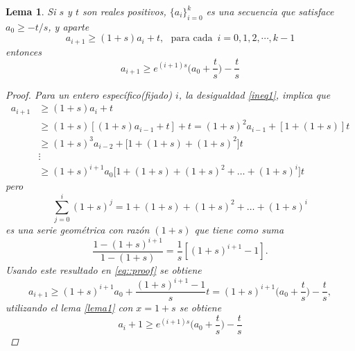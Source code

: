 \documentclass[a4paper]{article}
\newtheorem{lemma}{Lema}
\begin{document}
\begin{lemma}
Si $s$ y $t$ son reales positivos, $\{a_i\}_{i=0}^{k}$ es una secuencia que satisface $a_0\geq -t/s$, y aparte
\begin{equation}\label{ineq1}
a_{i+1}\geq (1+s)a_i + t, \,\,\,\, \text{para cada }\, i=0,1,2,\cdots, k-1
\end{equation}
entonces
\begin{equation*}
a_{i+1} \geq e^{(i+1)s}\bigg( a_0 +\frac{t}{s} \bigg)-\frac{t}{s}
\end{equation*}
\begin{proof}
Para un entero específico(fijado) $i$, la desigualdad  \ref{ineq1}, implica que 
\begin{equation}\label{eq::proof}
\begin{split}
a_{i+1} &\geq (1+s)a_i+t \\
&\geq (1+s)[(1+s)a_{i-1}+t]+t=(1+s)^2 a_{i-1}+[1+(1+s)]t\\
&\geq (1+s)^3 a_{i-2} +\big[ 1+(1+s)+(1+s)^2 \big]t\\
&\vdots\\
&\geq (1+s)^{i+1} a_0\big[ 1+(1+s)+(1+s)^2+\hdots+(1+s)^i\big]t
\end{split}
\end{equation}
pero
\begin{equation*}
\sum_{j=0}^{i}(1+s)^j=1+(1+s)+(1+s)^2+\hdots+(1+s)^i
\end{equation*}
es una serie geométrica con razón $(1+s)$ que tiene como suma
\begin{equation*}
\frac{1-(1+s)^{i+1}}{1-(1+s)}=\frac{1}{s}[(1+s)^{i+1}-1].
\end{equation*}
Usando este resultado en \ref{eq::proof} se obtiene
\begin{equation}
a_{i+1}\geq (1+s)^{i+1} a_0 + \frac{(1+s)^{i+1}-1}{s} t =(1+s)^{i+1}\bigg(a_0+\frac{t}{s}\bigg)-\frac{t}{s},
\end{equation}
utilizando el lema \ref{lema1} con $x=1+s$ se obtiene
\begin{equation}
a_i+1 \geq e^{(i+1)s}\bigg(a_0 + \frac{t}{s} \bigg) -\frac{t}{s}
\end{equation}
\end{proof}
\end{lemma}
\end{document}
